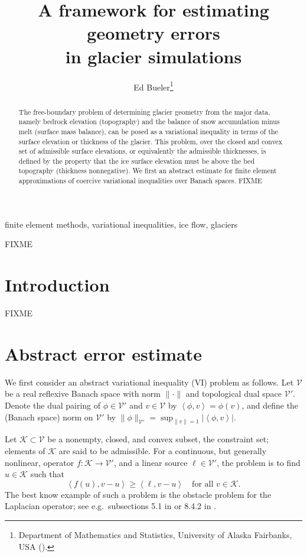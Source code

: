 \documentclass[hidelinks,onefignum,onetabnum,final]{siamart220329}  %
\title{A framework for estimating geometry errors \\ in glacier simulations}
\author{Ed Bueler\thanks{Department of Mathematics and Statistics, University of Alaska Fairbanks, USA (\email{elbueler@alaska.edu}).}}
\newcommand{\cK}{\mathcal{K}}
\newcommand{\cV}{\mathcal{V}}
\newcommand{\ip}[2]{\left<#1,#2\right>}
\begin{document}
\maketitle

\begin{abstract}
The free-boundary problem of determining glacier geometry from the major data, namely bedrock elevation (topography) and the balance of snow accumulation minus melt (surface mass balance), can be posed as a variational inequality in terms of the surface elevation or thickness of the glacier.  This problem, over the closed and convex set of admissible surface elevations, or equivalently the admissible thicknesses, is defined by the property that the ice surface elevation must be above the bed topography (thickness nonnegative).  We first an abstract estimate for finite element approximations of coercive variational inequalities over Banach spaces.  FIXME
\end{abstract}

\begin{keywords}
finite element methods, variational inequalities, ice flow, glaciers
\end{keywords}

\begin{MSCcodes}
FIXME
\end{MSCcodes}


\section{Introduction} \label{sec:intro}

FIXME


\section{Abstract error estimate} \label{sec:abstractestimate}

We first consider an abstract variational inequality (VI) \cite{KinderlehrerStampacchia1980} problem as follows.  Let $\cV$ be a real reflexive Banach space with norm $\|\cdot\|$ and topological dual space $\cV'$.  Denote the dual pairing of $\phi \in \cV'$ and $v\in\cV$ by $\ip{\phi}{v} = \phi(v)$, and define the (Banach space) norm on $\cV'$ by $\|\phi\|_{\cV'} = \sup_{\|v\|=1} |\!\ip{\phi}{v}\!|$.

Let $\cK \subset \cV$ be a nonempty, closed, and convex subset, the constraint set; elements of $\cK$ are said to be admissible.  For a continuous, but generally nonlinear, operator $f:\cK \to \cV'$, and a linear source $\ell\in \cV'$, the problem is to find $u\in \cK$ such that
\begin{equation}
\ip{f(u)}{v-u} \ge \ip{\ell}{v-u} \quad \text{for all } v\in \cK. \label{eq:vi}
\end{equation}
The best know example of such a problem is the obstacle problem for the Laplacian operator; see e.g.~subsections 5.1 in \cite{Ciarlet2002} or 8.4.2 in \cite{Evans2010}.
\end{document}
